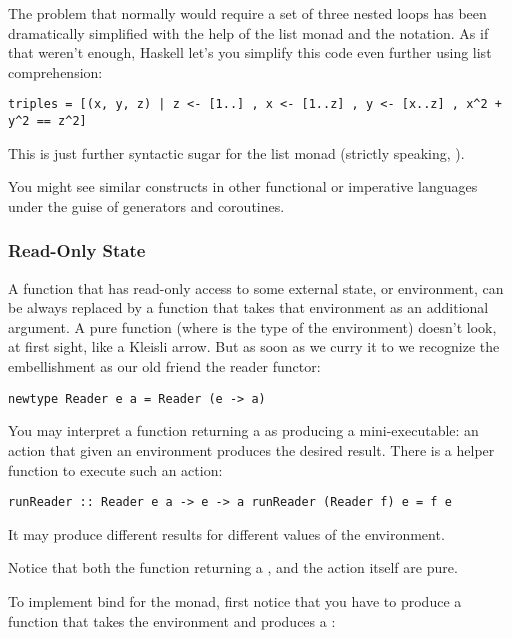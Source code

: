 The problem that normally would require a set of three nested loops has
been dramatically simplified with the help of the list monad and the
 notation. As if that weren't enough, Haskell let's you
simplify this code even further using list comprehension:

\begin{verbatim}
triples = [(x, y, z) | z <- [1..] , x <- [1..z] , y <- [x..z] , x^2 + y^2 == z^2]
\end{verbatim}

This is just further syntactic sugar for the list monad (strictly
speaking, ).

You might see similar constructs in other functional or imperative
languages under the guise of generators and coroutines.

\subsubsection{Read-Only State}\label{read-only-state}

A function that has read-only access to some external state, or
environment, can be always replaced by a function that takes that
environment as an additional argument. A pure function
 (where  is the type of
the environment) doesn't look, at first sight, like a Kleisli arrow. But
as soon as we curry it to
 we recognize the
embellishment as our old friend the reader functor:

\begin{verbatim}
newtype Reader e a = Reader (e -> a)
\end{verbatim}

You may interpret a function returning a  as producing a
mini-executable: an action that given an environment produces the
desired result. There is a helper function  to execute
such an action:

\begin{verbatim}
runReader :: Reader e a -> e -> a runReader (Reader f) e = f e
\end{verbatim}

It may produce different results for different values of the
environment.

Notice that both the function returning a , and the
 action itself are pure.

To implement bind for the  monad, first notice that you
have to produce a function that takes the environment  and
produces a :

